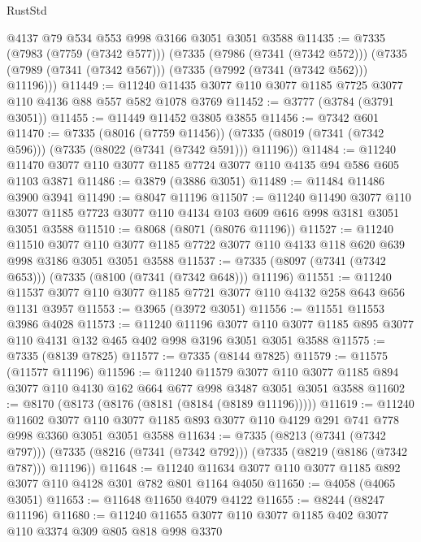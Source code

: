 \begin{lexlean}{RustStd}
\begin{coremodule}
{\begin{coremodule}
{{{{{{{{{{{{{{{{{{{{{{{{{{{{{{{{    @4137
    @79
    @534
    @553
    @998
    @3166
    @3051
    @3051
    @3588
@11435 := @7335
    (@7983 (@7759 (@7342 @577)))
    (@7335
      (@7986 (@7341 (@7342 @572)))
      (@7335 (@7989 (@7341 (@7342 @567))) (@7335 (@7992 (@7341 (@7342 @562))) @11196)))
@11449 := @11240 @11435 @3077 @110 @3077 @1185 @7725 @3077 @110 @4136 @88 @557 @582 @1078 @3769
@11452 := @3777 (@3784 (@3791 @3051))
@11455 := @11449 @11452 @3805 @3855
@11456 := @7342 @601
@11470 := @7335
    (@8016 (@7759 @11456))
    (@7335 (@8019 (@7341 (@7342 @596))) (@7335 (@8022 (@7341 (@7342 @591))) @11196))
@11484 := @11240 @11470 @3077 @110 @3077 @1185 @7724 @3077 @110 @4135 @94 @586 @605 @1103 @3871
@11486 := @3879 (@3886 @3051)
@11489 := @11484 @11486 @3900 @3941
@11490 := @8047 @11196
@11507 := @11240
    @11490
    @3077
    @110
    @3077
    @1185
    @7723
    @3077
    @110
    @4134
    @103
    @609
    @616
    @998
    @3181
    @3051
    @3051
    @3588
@11510 := @8068 (@8071 (@8076 @11196))
@11527 := @11240
    @11510
    @3077
    @110
    @3077
    @1185
    @7722
    @3077
    @110
    @4133
    @118
    @620
    @639
    @998
    @3186
    @3051
    @3051
    @3588
@11537 := @7335 (@8097 (@7341 (@7342 @653))) (@7335 (@8100 (@7341 (@7342 @648))) @11196)
@11551 := @11240 @11537 @3077 @110 @3077 @1185 @7721 @3077 @110 @4132 @258 @643 @656 @1131 @3957
@11553 := @3965 (@3972 @3051)
@11556 := @11551 @11553 @3986 @4028
@11573 := @11240
    @11196
    @3077
    @110
    @3077
    @1185
    @895
    @3077
    @110
    @4131
    @132
    @465
    @402
    @998
    @3196
    @3051
    @3051
    @3588
@11575 := @7335 (@8139 @7825)
@11577 := @7335 (@8144 @7825)
@11579 := @11575 (@11577 @11196)
@11596 := @11240
    @11579
    @3077
    @110
    @3077
    @1185
    @894
    @3077
    @110
    @4130
    @162
    @664
    @677
    @998
    @3487
    @3051
    @3051
    @3588
@11602 := @8170 (@8173 (@8176 (@8181 (@8184 (@8189 @11196)))))
@11619 := @11240
    @11602
    @3077
    @110
    @3077
    @1185
    @893
    @3077
    @110
    @4129
    @291
    @741
    @778
    @998
    @3360
    @3051
    @3051
    @3588
@11634 := @7335
    (@8213 (@7341 (@7342 @797)))
    (@7335 (@8216 (@7341 (@7342 @792))) (@7335 (@8219 (@8186 (@7342 @787))) @11196))
@11648 := @11240 @11634 @3077 @110 @3077 @1185 @892 @3077 @110 @4128 @301 @782 @801 @1164 @4050
@11650 := @4058 (@4065 @3051)
@11653 := @11648 @11650 @4079 @4122
@11655 := @8244 (@8247 @11196)
@11680 := @11240
    @11655
    @3077
    @110
    @3077
    @1185
    @402
    @3077
    @110
    @3374
    @309
    @805
    @818
    @998
    @3370
}}}}}}}}}}}}}}}}}}}}}}}}}}}}}}}}
\end{coremodule}}
\end{coremodule}
\end{lexlean}
